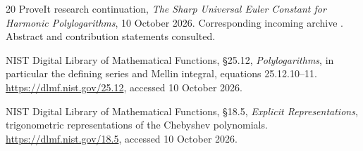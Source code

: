 \documentclass[11pt,letterpaper]{article}
\numberwithin{equation}{section}
\theoremstyle{definition}
\theoremstyle{remark}
\begin{document}
\begin{thebibliography}{20}
ProveIt research continuation,
\emph{The Sharp Universal Euler Constant for Harmonic Polylogarithms},
10 October 2026. Corresponding incoming archive
.
Abstract and contribution statements consulted.

NIST Digital Library of Mathematical Functions,
\S25.12, \emph{Polylogarithms}, in particular the defining series and
Mellin integral, equations 25.12.10--11.
\url{https://dlmf.nist.gov/25.12}, accessed 10 October 2026.

NIST Digital Library of Mathematical Functions,
\S18.5, \emph{Explicit Representations}, trigonometric representations
of the Chebyshev polynomials.
\url{https://dlmf.nist.gov/18.5}, accessed 10 October 2026.
\end{thebibliography}
\end{document}
